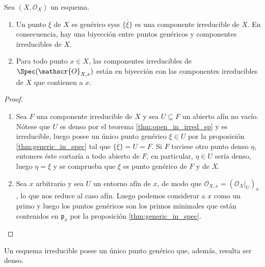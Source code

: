 \begin{prop}\label{thm:generic_pts}
	Sea $(X, \mathscr{O}_X)$ un esquema.
	\begin{enumerate}
		\item Un punto $\xi$ de $X$ es genérico syss $\overline{\{ \xi \}}$ es una componente irreducible de $X$.
			En consecuencia, hay una biyección entre puntos genéricos y componentes irreducibles de $X$.
		\item Para todo punto $x \in X$, las componentes irreducibles de $\Spec(\mathscr{O}_{X, x})$ están en biyección con
			las componentes irreducibles de $X$ que contienen a $x$.
	\end{enumerate}
\end{prop}
\begin{proof}
	\begin{enumerate}
		\item Sea $F$ una componente irreducible de $X$ y sea $U \subseteq F$ un abierto afín no vacío.
			Nótese que $U$ es denso por el teorema \ref{thm:open_in_irred_sp} y es irreducible,
			luego posee un único punto genérico $\xi \in U$ por la proposición \ref{thm:generic_in_spec} tal que $\overline{\{ \xi \}} = U = F $.
			Si $F$ tuviese otro punto denso $\eta$, entonces éste cortaría a todo abierto de $F$, en particular, $\eta \in U$ sería denso,
			luego $\eta = \xi$ y se comprueba que $\xi$ es punto genérico de $F$ y de $X$.

		\item Sea $x$ arbitrario y sea $U$ un entorno afín de $x$, de modo que $\mathscr{O}_{X, x} = (\mathscr{O}_X|_U)_x$,
			lo que nos reduce al caso afín.
			Luego podemos considerar a $x$ como un primo y luego los puntos genéricos son los primos minimales que están contenidos
			en $\mathfrak{p}_x$ por la proposición \ref{thm:generic_in_spec}. \qedhere
	\end{enumerate}
\end{proof}
\begin{cor}
	Un esquema irreducible posee un único punto genérico que, además, resulta ser denso.
\end{cor}

